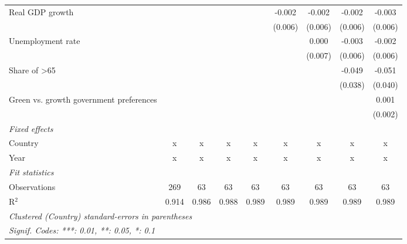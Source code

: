 \begin{table}[htbp]
\begin{tabular}{lcccccccc}
      Real GDP growth                                                    &              &         &         &               & -0.002        & -0.002        & -0.002       & -0.003\\   
                                                                         &              &         &         &               & (0.006)       & (0.006)       & (0.006)      & (0.006)\\   
      Unemployment rate                                                  &              &         &         &               &               & 0.000         & -0.003       & -0.002\\   
                                                                         &              &         &         &               &               & (0.007)       & (0.006)      & (0.006)\\   
      Share of >65                                                       &              &         &         &               &               &               & -0.049       & -0.051\\   
                                                                         &              &         &         &               &               &               & (0.038)      & (0.040)\\   
      Green vs. growth government preferences                            &              &         &         &               &               &               &              & 0.001\\   
                                                                         &              &         &         &               &               &               &              & (0.002)\\   
      \emph{Fixed effects}\\
      Country                                                            & x            & x       & x       & x             & x             & x             & x            & x\\  
      Year                                                               & x            & x       & x       & x             & x             & x             & x            & x\\  
      \midrule \emph{Fit statistics}\\
      Observations                                                       & 269          & 63      & 63      & 63            & 63            & 63            & 63           & 63\\  
      R$^2$                                                              & 0.914        & 0.986   & 0.988   & 0.989         & 0.989         & 0.989         & 0.989        & 0.989\\  
      \midrule
      \multicolumn{9}{l}{\emph{Clustered (Country) standard-errors in parentheses}}\\
      \multicolumn{9}{l}{\emph{Signif. Codes: ***: 0.01, **: 0.05, *: 0.1}}\\
   \end{tabular}
\end{table}


